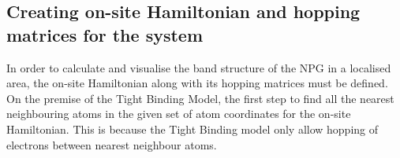 \subsection{Creating on-site Hamiltonian and hopping matrices for the system}
In order to calculate and visualise the band structure of the NPG in a localised area, the on-site Hamiltonian along with its hopping matrices must be defined. On the premise of the Tight Binding Model, the first step to find all the nearest neighbouring atoms in the given set of atom coordinates for the on-site Hamiltonian. This is because the Tight Binding model only allow hopping of electrons between nearest neighbour atoms. 
